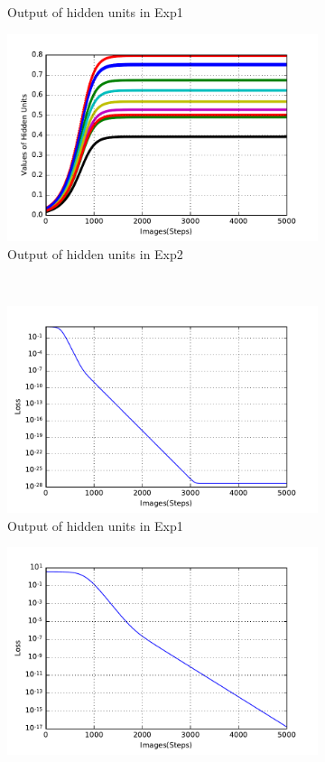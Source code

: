 \begin{figure}
\begin{subfigure}[t]{0.4\textwidth}
			\caption{Output of hidden units in Exp1}
		\end{subfigure}
		\begin{subfigure}[t]{0.4\textwidth}
			\includegraphics[width=\textwidth]{pics_sdlm/20_exp_AE/exp2_hid_non.pdf}
			\caption{Output of hidden units in Exp2}
		\end{subfigure}\\
		\begin{subfigure}[t]{0.4\textwidth}
			\includegraphics[width=\textwidth]{pics_sdlm/20_exp_AE/exp1_loss.pdf}
			\caption{Output of hidden units in Exp1}
		\end{subfigure}
		\begin{subfigure}[t]{0.4\textwidth}
			\includegraphics[width=\textwidth]{pics_sdlm/20_exp_AE/exp2_loss.pdf}

\end{subfigure}
\end{figure}
